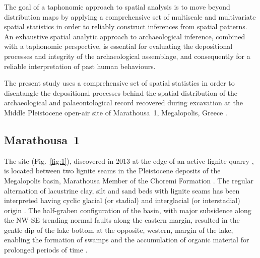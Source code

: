 \documentclass[preprint,authoryear,times]{elsarticle} %
\begin{document}
The goal of a taphonomic approach to spatial analysis is to move beyond distribution maps by applying a comprehensive set of multiscale and multivariate spatial statistics in order to reliably construct inferences from spatial patterns. An exhaustive spatial analytic approach to archaeological inference, combined with a taphonomic perspective, is essential for evaluating the depositional processes and integrity of the archaeological assemblage, and consequently for a reliable interpretation of past human behaviours.

The present study uses a comprehensive set of spatial statistics in order to disentangle the depositional processes behind the spatial distribution of the archaeological and palaeontological record recovered during excavation at the Middle Pleistocene open-air site of Marathousa~1, Megalopolis, Greece \citep{Panagopoulou2015,Harvati2016}.


\subsection{Marathousa~1}

The site (Fig.~\ref{fig:1}), discovered in 2013 at the edge of an active lignite quarry \citep{Thompson}, is located between two lignite seams in the Pleistocene deposits of the Megalopolis basin, Marathousa Member of the Choremi Formation \citep{Vugt2000}. The regular alternation of lacustrine clay, silt and sand beds with lignite seams has been interpreted having cyclic glacial (or stadial) and interglacial (or interstadial) origin \citep{Nickel1996}. The half-graben configuration of the basin, with major subsidence along the NW-SE trending normal faults along the eastern margin, resulted in the gentle dip of the lake bottom at the opposite, western, margin of the lake, enabling the formation of swamps and the accumulation of organic material for prolonged periods of time \citep{Vugt2000}.
\end{document}
